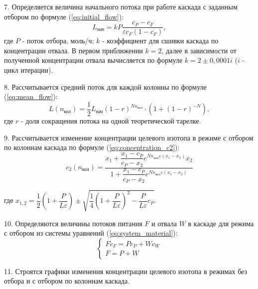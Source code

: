 7. Определяется величина начального потока при работе каскада с 
заданным отбором по формуле (\ref{eq:initial_flow}):
\begin{equation}\label{eq:initial_flow}
L_{\text{нач}} = kP\dfrac{c_{P} - c_{F}}{\varepsilon c_{F}(1 - c_{F})},
\end{equation}
\noindent где $P$ - поток отбора, моль/ч; $k$ - коэффициент для сшивки каскада по концентрации отвала. 
В первом приближении $k = 2$, далее в зависимости от полученной концентрации отвала вычисляется по формуле
$k = 2 \pm 0,0001i$ ($i$ - цикл итерации).

8. Рассчитывается средний поток для каждой колонны по формуле (\ref{eq:mean_flow}):
\begin{equation}\label{eq:mean_flow}
L(n_{\text{кол}}) = \dfrac{1}{2}L_{\text{нач}}(1 - r)^{Nn_{\text{кол}}}\cdot (1 + (1 - r)^{-N}),
\end{equation}
\noindent где $r$ - доля сокращения потока на одной теоретической тарелке.

9. Рассчитывается изменение концентрации целевого изотопа в режиме 
с отбором по колоннам каскада по формуле (\ref{eq:concentration_c2}):
\begin{equation}\label{eq:concentration_c2}
    c_{2}(n_{\text{кол}}) = \dfrac{x_{1} + \dfrac{x_{1} - c_{P}}{c_{P} - x_{2}} e^{Nn_{\text{кол}}\varepsilon (x_{1} - x_{2})}x_{2}}{1 + \dfrac{x_{1} - c_{P}}{c_{P} - x_{2}} e^{Nn_{\text{кол}}\varepsilon (x_{1} - x_{2})}}
\end{equation}

\noindent где $x_{1,2} = \dfrac{1}{2}(1 + \dfrac{P}{L\varepsilon})\pm \sqrt{\dfrac{1}{4}(1 + \dfrac{P}{L\varepsilon})^{2} - \dfrac{P}{L\varepsilon}c_{P}}.$

10. Определяются величины потоков питания $F$ и отвала $W$ в каскаде для 
режима с отбором из системы уравнений (\ref{eq:system_material}):
\begin{equation}\label{eq:system_material}
\begin{cases}
Fc_{F} = Pc_{P} + Wc_{W}\\
F = P + W
\end{cases}
\end{equation}

11. Строятся графики изменения концентрации целевого изотопа в режимах 
без отбора и с отбором по колоннам каскада.

\newpage